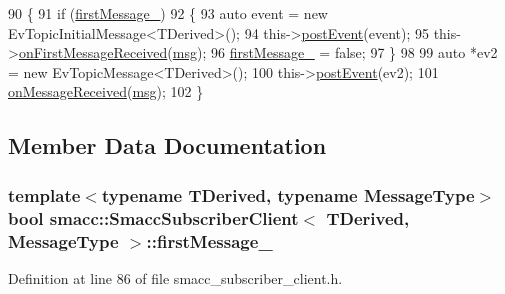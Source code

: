 \begin{DoxyCode}
90   \{
91     \textcolor{keywordflow}{if} (\hyperlink{classsmacc_1_1SmaccSubscriberClient_acfb1bf9d488d40a55c61861e2bc39346}{firstMessage\_})
92     \{
93       \textcolor{keyword}{auto} \textcolor{keyword}{event} = \textcolor{keyword}{new} EvTopicInitialMessage<TDerived>();
94       this->\hyperlink{classsmacc_1_1ISmaccClient_a46cbc0d695214efe40d29247323bfc80}{postEvent}(event);
95       this->\hyperlink{classsmacc_1_1SmaccSubscriberClient_a9c77384c3271293906b47c1e94d55036}{onFirstMessageReceived}(\hyperlink{namespacekeyboard__node_a768777e12f75b89e4a0a60acf748e9eb}{msg});
96       \hyperlink{classsmacc_1_1SmaccSubscriberClient_acfb1bf9d488d40a55c61861e2bc39346}{firstMessage\_} = \textcolor{keyword}{false};
97     \}
98 
99     \textcolor{keyword}{auto} *ev2 = \textcolor{keyword}{new} EvTopicMessage<TDerived>();
100     this->\hyperlink{classsmacc_1_1ISmaccClient_a46cbc0d695214efe40d29247323bfc80}{postEvent}(ev2);
101     \hyperlink{classsmacc_1_1SmaccSubscriberClient_afa92da03ebd637e2565eee5cf226ca43}{onMessageReceived}(\hyperlink{namespacekeyboard__node_a768777e12f75b89e4a0a60acf748e9eb}{msg});
102   \}
\end{DoxyCode}


\subsection{Member Data Documentation}
\subsubsection[{\texorpdfstring{first\+Message\+\_\+}{firstMessage_}}]{\setlength{\rightskip}{0pt plus 5cm}template$<$typename T\+Derived, typename Message\+Type$>$ {\bf bool} {\bf smacc\+::\+Smacc\+Subscriber\+Client}$<$ T\+Derived, Message\+Type $>$\+::first\+Message\+\_\+\hspace{0.3cm}{\ttfamily [private]}}\hypertarget{classsmacc_1_1SmaccSubscriberClient_acfb1bf9d488d40a55c61861e2bc39346}{}\label{classsmacc_1_1SmaccSubscriberClient_acfb1bf9d488d40a55c61861e2bc39346}


Definition at line 86 of file smacc\+\_\+subscriber\+\_\+client.\+h.

